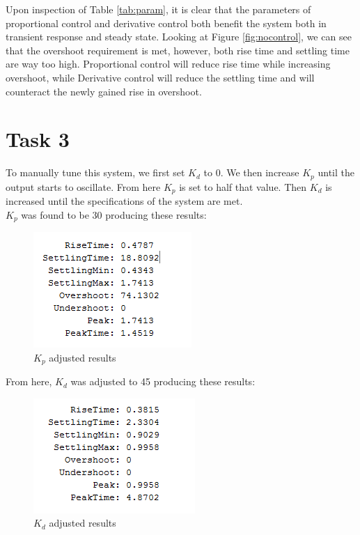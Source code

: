 \documentclass[12pt,letter]{article}
\begin{document}
\noindent Upon inspection of Table \ref{tab:param}, it is clear that the parameters of proportional control and derivative control both benefit the system both in transient response and steady state. Looking at Figure \ref{fig:nocontrol}, we can see that the overshoot requirement is met, however, both rise time and settling time are way too high. Proportional control will reduce rise time while increasing overshoot, while Derivative control will reduce the settling time and will counteract the newly gained rise in overshoot.
\\ 
\section*{Task 3}
\noindent To manually tune this system, we first set $K_d$ to 0. We then increase $K_p$ until the output starts to oscillate. From here $K_p$ is set to half that value. Then $K_d$ is increased until the specifications of the system are met.
\\
\noindent $K_p$ was found to be 30 producing these results:
\begin{figure}[H]
\centering
\includegraphics[width=.5\linewidth]{kpresults}
\caption{$K_p$ adjusted results}
\label{fig:kpresults}
\end{figure}

From here, $K_d$ was adjusted to 45 producing these results:
\begin{figure}[H]
\centering
\includegraphics[width=.5\linewidth]{kdresults}
\caption{$K_d$ adjusted results}
\label{fig:kdresults}
\end{figure}
\end{document}
